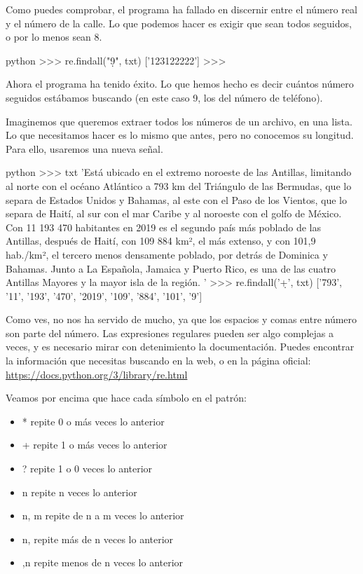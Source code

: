\documentclass{article}
\begin{document}
Como puedes comprobar, el programa ha fallado en discernir entre el número real y el número de la calle. Lo que podemos hacer es exigir que sean todos seguidos, o por lo menos sean 8.

\begin{mintedbox}{python}
>>> re.findall("\d{9}", txt)
['123122222']
>>>
\end{mintedbox}

Ahora el programa ha tenido éxito. Lo que hemos hecho es decir cuántos número seguidos estábamos buscando (en este caso 9, los del número de teléfono).


Imaginemos que queremos extraer todos los números de un archivo, en una lista. Lo que necesitamos hacer es lo mismo que antes, pero no conocemos su longitud. Para ello, usaremos una nueva señal.

\begin{mintedbox}{python}
>>> txt
'Está ubicado en el extremo noroeste de las Antillas, limitando al norte con el océano Atlántico a 793 km del Triángulo de las Bermudas, que lo separa de Estados Unidos y Bahamas, al este con el Paso de los Vientos, que lo separa de Haití, al sur con el mar Caribe y al noroeste con el golfo de México. Con 11 193 470 habitantes en 2019 es el segundo país más poblado de las Antillas, después de Haití, con 109 884 km², el más extenso, y con 101,9 hab./km², el tercero menos densamente poblado, por detrás de Dominica y Bahamas. Junto a La Española, Jamaica y Puerto Rico, es una de las cuatro Antillas Mayores y la mayor isla de la región. '
>>> re.findall('\d+', txt)
['793', '11', '193', '470', '2019', '109', '884', '101', '9']
\end{mintedbox}
Como ves, no nos ha servido de mucho, ya que los espacios y comas entre número son parte del número. Las expresiones regulares pueden ser algo complejas a veces, y es necesario mirar con detenimiento la documentación. Puedes encontrar la información que necesitas buscando en la web, o en la página oficial: \url{https://docs.python.org/3/library/re.html}

Veamos por encima que hace cada símbolo en el patrón:

\begin{itemize}
    \item * repite 0 o más veces lo anterior
    \item + repite 1 o más veces lo anterior
     \item ? repite 1 o 0 veces lo anterior
     \item {n} repite n veces lo anterior
     \item {n, m} repite de n a m veces lo anterior
     \item {n,} repite más de n veces lo anterior
     \item {,n} repite menos de n veces lo anterior
\end{itemize}
\end{document}
